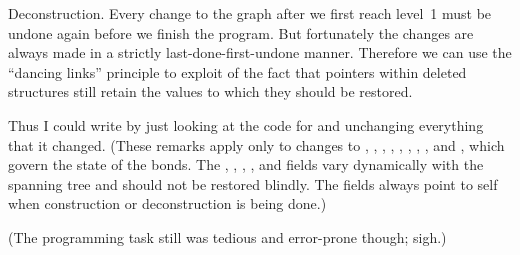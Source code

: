 Deconstruction. Every change to the graph after we first reach level~1
must be undone again before we finish the program. But fortunately
the changes are always made in a strictly last-done-first-undone
manner. Therefore we can use the ``dancing links'' principle to
exploit of the fact that pointers within deleted structures
still retain the values to which they should be restored.

Thus I could write  by just looking at the code for 
and unchanging everything that it changed.
(These remarks apply only to changes
to , , , , ,
, , ,
and , which govern the state of the bonds. The , , ,
, and  fields vary dynamically with the spanning tree
and
should not be restored blindly. The  fields always point to self
when
construction or deconstruction is being done.)

(The programming task still was tedious and error-prone though; sigh.)

